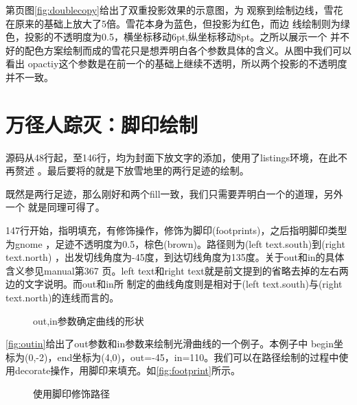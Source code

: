 \documentclass[10pt,a4paper,titlepage]{article}
\begin{document}
第\pageref{fig:doublecopy}页图\ref{fig:doublecopy}给出了双重投影效果的示意图，为
观察到绘制边线，雪花在原来的基础上放大了5倍。雪花本身为蓝色，但投影为红色，而边
线绘制则为绿色，投影的不透明度为0.5，横坐标移动6pt,纵坐标移动8pt。之所以展示一个
并不好的配色方案绘制而成的雪花只是想弄明白各个参数具体的含义。从图中我们可以看出
opactiy这个参数是在前一个的基础上继续不透明，所以两个投影的不透明度并不一致。

\section{万径人踪灭：脚印绘制}

源码从48行起，至146行，均为封面下放文字的添加，使用了listings环境，在此不再赘述
。最后要将的就是下放雪地里的两行足迹的绘制。



既然是两行足迹，那么刚好和两个fill一致，我们只需要弄明白一个的道理，另外一个
就是同理可得了。

147行开始，指明填充，有修饰操作，修饰为脚印(footprints)，之后指明脚印类型为gnome
，足迹不透明度为0.5，棕色(brown)。路径则为(left text.south)到(right text.north)
，出发切线角度为-45度，到达切线角度为135度。关于out和in的具体含义参见manual第367
页。left text和right text就是前文提到的省略去掉的左右两边的文字说明。而out和in所
制定的曲线角度则是相对于(left text.south)与(right text.north)的连线而言的。

\begin{figure}[htbp]
\centering
{}
\caption{out,in参数确定曲线的形状}
\label{fig:outin}
\end{figure}

\autoref{fig:outin}给出了out参数和in参数来绘制光滑曲线的一个例子。本例子中
begin坐标为(0,-2)，end坐标为(4,0)，out=-45，in=110。我们可以在路径绘制的过程中使
用decorate操作，用脚印来填充。如\autoref{fig:footprint}所示。

\begin{figure}[htbp]
\centering
{}
\caption{使用脚印修饰路径}
\label{fig:footprint}
\end{figure}
\end{document}
